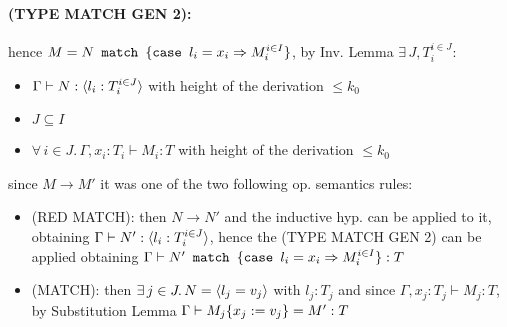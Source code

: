 \paragraph*{\textmd{(TYPE MATCH GEN 2):}}
hence $M = N\texttt{ match }\{\texttt{case }l_i = x_i \Rightarrow M_i^{i \in I}\}$, by Inv. Lemma $\exists\, J, T_i^{i \in J}$:
\begin{itemize}
	\item $\Gamma \vdash N: \langle l_i: T_i^{i \in J} \rangle$ with height of the derivation $\le k_0$
	\item $J \subseteq I$
	\item $\forall\, i \in J.\, \Gamma, x_i: T_i \vdash M_i: T$ with height of the derivation $\le k_0$
\end{itemize}
since $M \to M'$ it was one of the two following op. semantics rules:
\begin{itemize}
	\item (RED MATCH): then $N \to N'$ and the inductive hyp. can be applied to it, obtaining
	      $\Gamma \vdash N': \langle l_i: T_i^{i \in J} \rangle$, hence the (TYPE MATCH GEN 2) can be applied obtaining
	      $\Gamma \vdash N'\texttt{ match }\{\texttt{case }l_i = x_i \Rightarrow M_i^{i \in I}\}: T$
	\item (MATCH): then $\exists\, j \in J.\, N = \langle l_j = v_j \rangle$ with $l_j: T_j$ and since
	      $\Gamma, x_j: T_j \vdash M_j: T$, by Substitution Lemma $\Gamma \vdash M_j\{x_j:=v_j\} = M': T$
\end{itemize}
